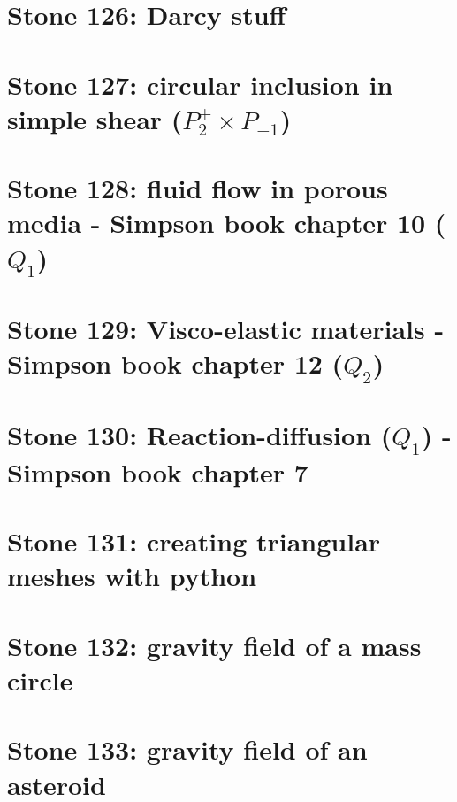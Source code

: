 \documentclass[a4paper,11pt]{report}
\begin{document}
\chapter{Stone 126: Darcy stuff\label{f126}}

\chapter{Stone 127: circular inclusion in simple shear ($P_2^+\times P_{-1}$)\label{f127}}

\chapter{Stone 128: fluid flow in porous media - Simpson book chapter 10 ($Q_1$)\label{f128}}

\chapter{Stone 129: Visco-elastic materials - Simpson book chapter 12 ($Q_2$)\label{f129}}

\chapter{Stone 130: Reaction-diffusion ($Q_1$) - Simpson book chapter 7\label{f130}}

\chapter{Stone 131: creating triangular meshes with python \label{f131}}

\chapter{Stone 132: gravity field of a mass circle\label{f132}}

\chapter{Stone 133: gravity field of an asteroid\label{f133}}
\end{document}
